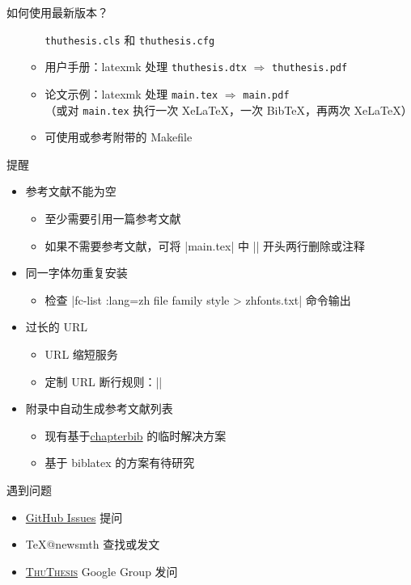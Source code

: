 \documentclass[xcolor=table,dvipsnames,svgnames]{beamer}
\newcommand{\ThuThesis}{\textsc{ThuThesis}\xspace}
\begin{document}
\begin{frame}{如何使用最新版本？}
\begin{itemize}
\begin{itemize}
          \texttt{thuthesis.cls} 和 \texttt{thuthesis.cfg}
        \item 用户手册：latexmk 处理 \texttt{thuthesis.dtx} $\Rightarrow$
          \texttt{thuthesis.pdf}
        \item 论文示例：latexmk 处理 \texttt{main.tex} $\Rightarrow$
          \texttt{main.pdf}\\
          （或对 \texttt{main.tex} 执行一次 XeLaTeX，一次 BibTeX，再两次
          XeLaTeX）
        \item 可使用或参考附带的 Makefile
      \end{itemize}
  \end{itemize}
\end{frame}

\begin{frame}[fragile]{提醒}
  \begin{itemize}
  \item 参考文献不能为空
    \begin{itemize}
      \item 至少需要引用一篇参考文献
      \item 如果不需要参考文献，可将 |main.tex| 中 |\bib| 开头两行删除或注释
    \end{itemize}
  \item 同一字体勿重复安装
    \begin{itemize}
      \item 检查 |fc-list :lang=zh file family style > zhfonts.txt| 命令输出
    \end{itemize}
  \item 过长的 URL
    \begin{itemize}
      \item URL 缩短服务
      \item 定制 URL 断行规则：||
    \end{itemize}
  \item 附录中自动生成参考文献列表
    \begin{itemize}
      \item 现有基于\href{https://github.com/linhr/thuappendixbib}{chapterbib}%
        的临时解决方案
      \item 基于 biblatex 的方案有待研究
    \end{itemize}
  \end{itemize}
\end{frame}

\begin{frame}{遇到问题}
\begin{itemize}
  \item \href{https://github.com/xueruini/thuthesis/issues}{GitHub Issues} 提问
  \item \TeX @newsmth 查找或发文
  \item \href{http://groups.google.com/group/thuthesis}\ThuThesis{} Google Group 发问
\end{itemize}
\end{frame}
\end{document}
